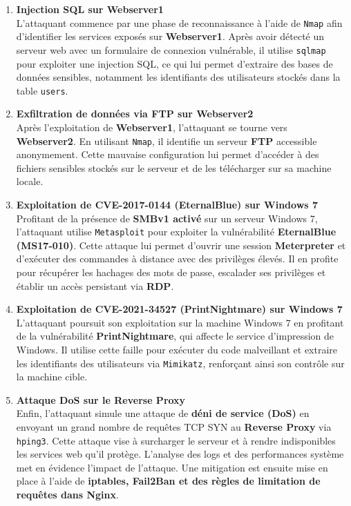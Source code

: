 \documentclass[a4paper,12pt]{report}
\begin{document}
\begin{enumerate}
    \item \textbf{Injection SQL sur Webserver1}\\
    L'attaquant commence par une phase de reconnaissance à l'aide de \texttt{Nmap} afin d’identifier les services exposés sur \textbf{Webserver1}. Après avoir détecté un serveur web avec un formulaire de connexion vulnérable, il utilise \texttt{sqlmap} pour exploiter une injection SQL, ce qui lui permet d’extraire des bases de données sensibles, notamment les identifiants des utilisateurs stockés dans la table \texttt{users}.

    \item \textbf{Exfiltration de données via FTP sur Webserver2}\\
    Après l’exploitation de \textbf{Webserver1}, l’attaquant se tourne vers \textbf{Webserver2}. En utilisant \texttt{Nmap}, il identifie un serveur \textbf{FTP} accessible anonymement. Cette mauvaise configuration lui permet d’accéder à des fichiers sensibles stockés sur le serveur et de les télécharger sur sa machine locale.

    \item \textbf{Exploitation de CVE-2017-0144 (EternalBlue) sur Windows 7}\\
    Profitant de la présence de \textbf{SMBv1 activé} sur un serveur Windows 7, l’attaquant utilise \texttt{Metasploit} pour exploiter la vulnérabilité \textbf{EternalBlue (MS17-010)}. Cette attaque lui permet d’ouvrir une session \textbf{Meterpreter} et d’exécuter des commandes à distance avec des privilèges élevés. Il en profite pour récupérer les hachages des mots de passe, escalader ses privilèges et établir un accès persistant via \textbf{RDP}.

    \item \textbf{Exploitation de CVE-2021-34527 (PrintNightmare) sur Windows 7}\\
    L’attaquant poursuit son exploitation sur la machine Windows 7 en profitant de la vulnérabilité \textbf{PrintNightmare}, qui affecte le service d’impression de Windows. Il utilise cette faille pour exécuter du code malveillant et extraire les identifiants des utilisateurs via \texttt{Mimikatz}, renforçant ainsi son contrôle sur la machine cible.

    \item \textbf{Attaque DoS sur le Reverse Proxy}\\
    Enfin, l’attaquant simule une attaque de \textbf{déni de service (DoS)} en envoyant un grand nombre de requêtes TCP SYN au \textbf{Reverse Proxy} via \texttt{hping3}. Cette attaque vise à surcharger le serveur et à rendre indisponibles les services web qu’il protège. L’analyse des logs et des performances système met en évidence l’impact de l’attaque. Une mitigation est ensuite mise en place à l’aide de \textbf{iptables, Fail2Ban et des règles de limitation de requêtes dans Nginx}.

\end{enumerate}
\end{document}
